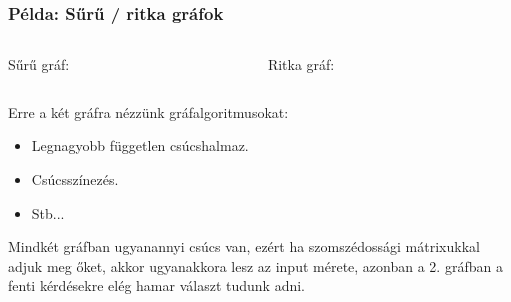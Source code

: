 \begin{frame}
\begin{footnotesize}
\frametitle{Példa: Sűrű / ritka gráfok}

\begin{columns}
\begin{column}{0.5\textwidth}
Sűrű gráf:

\end{column}

\begin{column}{0.5\textwidth}
Ritka gráf:

\end{column}
\end{columns}

Erre a két gráfra nézzünk gráfalgoritmusokat:
\begin{itemize}
\item Legnagyobb független csúcshalmaz.
\item Csúcsszínezés.
\item Stb...
\end{itemize}

Mindkét gráfban ugyanannyi csúcs van, ezért ha szomszédossági mátrixukkal adjuk meg őket, akkor
ugyanakkora lesz az input mérete, azonban a 2. gráfban a fenti kérdésekre elég hamar választ
tudunk adni.
\end{footnotesize}
\end{frame}

